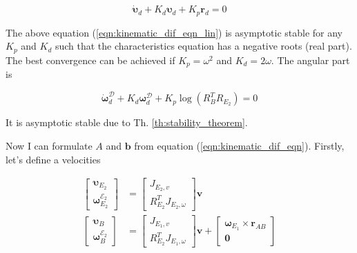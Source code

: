 \begin{equation}
    \dot{\boldsymbol{\upsilon}}_d + K_d \boldsymbol{\upsilon}_d + K_p \mathbf{r}_d = 0
    \label{eqn:kinematic_dif_eqn_lin}
\end{equation}

The above equation (\ref{eqn:kinematic_dif_eqn_lin}) is asymptotic stable for any 
$K_p$ and $K_d$ such that the characteristics equation has a negative roots 
(real part). The best convergence can be achieved if $K_p = \omega^2$ and 
$K_d = 2 \omega$. The angular part is 

\begin{equation}
    \dot{\boldsymbol{\omega}}_d^{\mathcal{D}} + 
    K_d \boldsymbol{\omega}_d^{\mathcal{D}} + 
    K_p \log (R_B^T R_{E_2}) = 0
    \label{eqn:kinematic_dif_eqn_ang}
\end{equation}

It is asymptotic stable due to Th. \ref{th:stability_theorem}.

Now I can formulate $A$ and $\mathbf{b}$ from equation (\ref{eqn:kinematic_dif_eqn}). 
Firstly, let's define a velocities

\begin{equation}
    \begin{aligned}
        \begin{bmatrix}
            \boldsymbol{\upsilon}_{E_2} \\
            \boldsymbol{\omega}_{E_2}^{\mathcal{E}_2}
        \end{bmatrix} & = 
        \begin{bmatrix}
            J_{E_2, v} \\
            R_{E_2}^T J_{E_2, \omega}
        \end{bmatrix}
        \mathbf{v} \\
        \begin{bmatrix}
            \boldsymbol{\upsilon}_B \\
            \boldsymbol{\omega}_{B}^{\mathcal{E}_2} 
        \end{bmatrix} & = 
        \begin{bmatrix}
            J_{E_1, v} \\
            R_{E_2}^T J_{E_1, \omega}
        \end{bmatrix}
        \mathbf{v} +
        \begin{bmatrix}
            \boldsymbol{\omega}_{E_1} \times \mathbf{r}_{AB} \\
            \mathbf{0}
        \end{bmatrix}
    \end{aligned}
    \label{eqn:velocities_from_q}
\end{equation}

